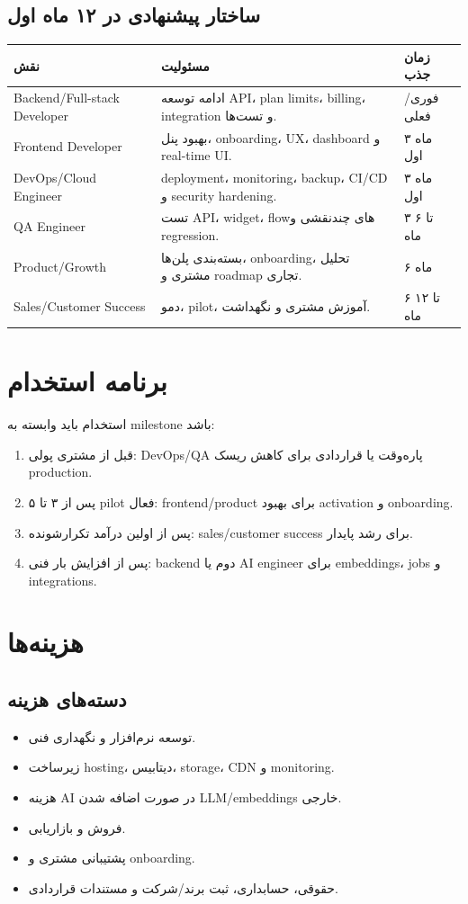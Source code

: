 \documentclass[12pt,a4paper]{article}
\begin{document}
\subsection{ساختار پیشنهادی در ۱۲ ماه اول}
\begin{longtable}{R{40mm} R{88mm} R{24mm}}
\toprule
\textbf{نقش} & \textbf{مسئولیت} & \textbf{زمان جذب} \\
\midrule
\endhead
Backend/Full-stack Developer & ادامه توسعه API، plan limits، billing، integration و تست‌ها. & فوری/فعلی \\
Frontend Developer & بهبود پنل، onboarding، UX، dashboard و real-time UI. & ۳ ماه اول \\
DevOps/Cloud Engineer & deployment، monitoring، backup، CI/CD و security hardening. & ۳ ماه اول \\
QA Engineer & تست API، widget، flowهای چندنقشی و regression. & ۳ تا ۶ ماه \\
Product/Growth & بسته‌بندی پلن‌ها، onboarding، تحلیل مشتری و roadmap تجاری. & ۶ ماه \\
Sales/Customer Success & دمو، pilot، آموزش مشتری و نگهداشت. & ۶ تا ۱۲ ماه \\
\bottomrule
\end{longtable}

\section{برنامه استخدام}
استخدام باید وابسته به milestone باشد:
\begin{enumerate}
  \item قبل از مشتری پولی: DevOps/QA پاره‌وقت یا قراردادی برای کاهش ریسک production.
  \item پس از ۳ تا ۵ pilot فعال: frontend/product برای بهبود activation و onboarding.
  \item پس از اولین درآمد تکرارشونده: sales/customer success برای رشد پایدار.
  \item پس از افزایش بار فنی: backend دوم یا AI engineer برای embeddings، jobs و integrations.
\end{enumerate}

\section{هزینه‌ها}
\subsection{دسته‌های هزینه}
\begin{itemize}
  \item توسعه نرم‌افزار و نگهداری فنی.
  \item زیرساخت hosting، دیتابیس، storage، CDN و monitoring.
  \item هزینه AI در صورت اضافه شدن LLM/embeddings خارجی.
  \item فروش و بازاریابی.
  \item پشتیبانی مشتری و onboarding.
  \item حقوقی، حسابداری، ثبت برند/شرکت و مستندات قراردادی.
\end{itemize}
\end{document}
